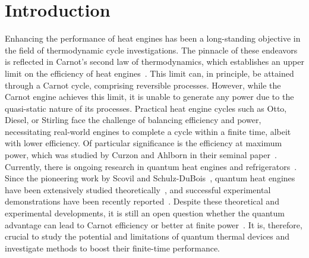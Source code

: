 \documentclass[aps,pra,twocolumn,showpacs,showkeys,groupedaddress,nobalancelastpage,nofootinbib,floatfix,superscriptaddress,longbibliography]{revtex4-2}
\begin{document}
\section{Introduction}
Enhancing the performance of heat engines has been a long-standing objective in the field of thermodynamic cycle investigations. The pinnacle of these endeavors is reflected in Carnot's second law of thermodynamics, which establishes an upper limit on the efficiency of heat engines~\cite{bhlitem57177}. This limit can, in principle, be attained through a Carnot cycle, comprising reversible processes. However, while the Carnot engine achieves this limit, it is unable to generate any power due to the quasi-static nature of its processes. Practical heat engine cycles such as Otto, Diesel, or Stirling face the challenge of balancing efficiency and power, necessitating real-world engines to complete a cycle within a finite time, albeit with lower efficiency. Of particular significance is the efficiency at maximum power, which was studied by Curzon and Ahlborn in their seminal paper~\cite{doi:10.1119/1.10023}.\\

Currently, there is ongoing research in quantum heat engines and refrigerators~\cite{doi:10.1146/annurev-physchem-040513-103724,Kosloff2017TheQH,tuncer2020,kurizki_kofman_2022,10.1088/2053-2571/ab21c6}. Since the pioneering work by Scovil and Schulz-DuBois~\cite{PhysRevLett.2.262}, quantum heat engines have been extensively studied theoretically~\cite{1979,doi:10.1063/1.446862,doi:10.1063/1.461951,10.1063/1.471453,10.1119/1.18197,PhysRevLett.88.050602,PhysRevLett.89.116801,doi:10.1126/science.1078955,PhysRevE.68.016101,PhysRevLett.93.140403,PhysRevE.70.046110,PhysRevE.72.056110,Rezek_2006,PhysRevE.76.031105,PhysRevE.77.041118,PhysRevLett.109.203006,PhysRevE.90.022102,Hardal2015,PhysRevE.95.032139,Turkpence_2017,PhysRevB.96.104304,PhysRevE.96.062120,Niedenzu2018,PhysRevE.97.062153,Naseem:19,PhysRevE.100.012109,PhysRevE.102.062123,Hamedani_Raja_2021}, and successful experimental demonstrations have been recently reported~\cite{PhysRevLett.119.050602,PhysRevLett.122.110601,PhysRevLett.123.240601,Bouton2021,doi:10.1126/sciadv.abl7740,PhysRevA.106.022436,Zhang2022,e25020311}. Despite these theoretical and experimental developments, it is still an open question whether the quantum advantage can lead to Carnot efficiency or better at finite power~\cite{PhysRevLett.112.030602,Campisi2016,Kim2022}. It is, therefore, crucial to study the potential and limitations of quantum thermal devices and investigate methods to boost their finite-time performance.\\
\end{document}
